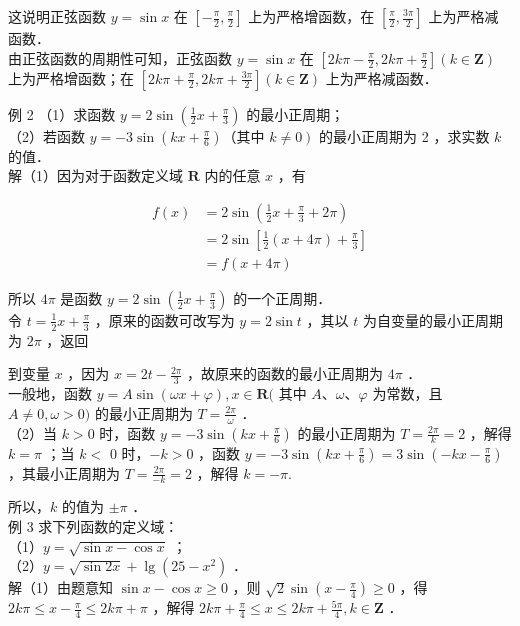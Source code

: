 \documentclass[10pt]{article}
\begin{document}
这说明正弦函数 \(y=\sin x\) 在 \(\left[-\frac{\pi}{2}, \frac{\pi}{2}\right]\) 上为严格增函数，在 \(\left[\frac{\pi}{2}, \frac{3 \pi}{2}\right]\) 上为严格减函数．\\
由正弦函数的周期性可知，正弦函数 \(y=\sin x\) 在 \(\left[2 k \pi-\frac{\pi}{2}, 2 k \pi+\frac{\pi}{2}\right](k \in \mathbf{Z})\) 上为严格增函数；在 \(\left[2 k \pi+\frac{\pi}{2}, 2 k \pi+\frac{3 \pi}{2}\right](k \in \mathbf{Z})\) 上为严格减函数．

例 2 （1）求函数 \(y=2 \sin \left(\frac{1}{2} x+\frac{\pi}{3}\right)\) 的最小正周期；\\
（2）若函数 \(y=-3 \sin \left(k x+\frac{\pi}{6}\right)\)（其中 \(\left.k \neq 0\right)\) 的最小正周期为 2 ，求实数 \(k\) 的值．\\
解（1）因为对于函数定义域 \(\mathbf{R}\) 内的任意 \(x\) ，有

\[
\begin{aligned}
f(x) & =2 \sin \left(\frac{1}{2} x+\frac{\pi}{3}+2 \pi\right) \\
& =2 \sin \left[\frac{1}{2}(x+4 \pi)+\frac{\pi}{3}\right] \\
& =f(x+4 \pi)
\end{aligned}
\]

所以 \(4 \pi\) 是函数 \(y=2 \sin \left(\frac{1}{2} x+\frac{\pi}{3}\right)\) 的一个正周期．\\
令 \(t=\frac{1}{2} x+\frac{\pi}{3}\) ，原来的函数可改写为 \(y=2 \sin t\) ，其以 \(t\) 为自变量的最小正周期为 \(2 \pi\) ，返回

到变量 \(x\) ，因为 \(x=2 t-\frac{2 \pi}{3}\) ，故原来的函数的最小正周期为 \(4 \pi\) ．\\
一般地，函数 \(y=A \sin (\omega x+\varphi), x \in \mathbf{R}(\) 其中 \(A 、 \omega 、 \varphi\) 为常数，且 \(A \neq 0, \omega>0)\) 的最小正周期为 \(T=\frac{2 \pi}{\omega}\) ．\\
（2）当 \(k>0\) 时，函数 \(y=-3 \sin \left(k x+\frac{\pi}{6}\right)\) 的最小正周期为 \(T=\frac{2 \pi}{k}=2\) ，解得 \(k=\pi\) ；当 \(k<\) 0 时，\(-k>0\) ，函数 \(y=-3 \sin \left(k x+\frac{\pi}{6}\right)=3 \sin \left(-k x-\frac{\pi}{6}\right)\) ，其最小正周期为 \(T=\frac{2 \pi}{-k}=2\) ，解得 \(k=-\pi\).

所以，\(k\) 的值为 \(\pm \pi\) ．\\
例 3 求下列函数的定义域：\\
（1）\(y=\sqrt{\sin x-\cos x}\) ；\\
（2）\(y=\sqrt{\sin 2 x}+\lg \left(25-x^{2}\right)\) ．\\
解（1）由题意知 \(\sin x-\cos x \geqslant 0\) ，则 \(\sqrt{2} \sin \left(x-\frac{\pi}{4}\right) \geqslant 0\) ，得 \(2 k \pi \leqslant x-\frac{\pi}{4} \leqslant 2 k \pi+\pi\) ，解得 \(2 k \pi+\frac{\pi}{4} \leqslant x \leqslant 2 k \pi+\frac{5 \pi}{4}, k \in \mathbf{Z}\) ．
\end{document}
